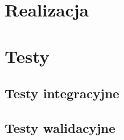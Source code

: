 
\chapter{Realizacja}
\label{ch:realizacja}



\chapter{Testy}
\label{ch:testy}

\section{Testy integracyjne}
\label{sec:testy-integracyjne}

\section{Testy walidacyjne}
\label{sec:testy-walidacyjne}


